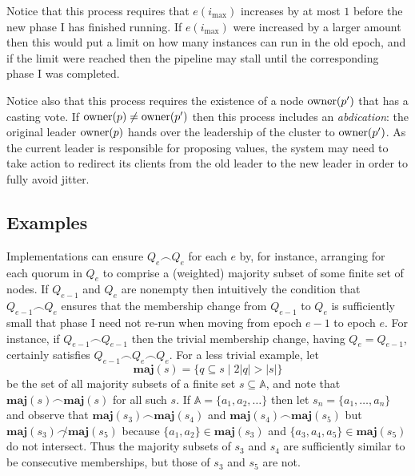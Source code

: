 \documentclass[journal]{IEEEtran}
\begin{document}
Notice that this process requires that $e(i_\mathrm{max})$ increases by at most
$1$ before the new phase I has finished running. If $e(i_\mathrm{max})$ were
increased by a larger amount then this would put a limit on how many instances
can run in the old epoch, and if the limit were reached then the pipeline may
stall until the corresponding phase I was completed.

Notice also that this process requires the existence of a node $\mathrm{owner}(p')$
that has a casting vote. If $\mathrm{owner}(p) \ne \mathrm{owner}(p')$ then this process
includes an \textit{abdication}: the original leader $\mathrm{owner}(p)$ hands over the
leadership of the cluster to $\mathrm{owner}(p')$. As the current leader is responsible
for proposing values, the system may need to take action to redirect its
clients from the old leader to the new leader in order to fully avoid jitter.

\subsection{Examples}\label{types-of-membership-change}

\def\maj#1{\mathbf{maj}(#1)}

Implementations can ensure $Q_e \frown Q_e$ for each $e$ by, for instance,
arranging for each quorum in $Q_e$ to comprise a (weighted) majority subset of
some finite set of nodes.  If $Q_{e-1}$ and $Q_e$ are nonempty then intuitively
the condition that $Q_{e-1} \frown Q_e$ ensures that the membership change from
$Q_{e-1}$ to $Q_e$ is sufficiently small that phase I need not re-run when
moving from epoch $e-1$ to epoch $e$.  For instance, if $Q_{e-1} \frown
Q_{e-1}$ then the trivial membership change, having $Q_e = Q_{e-1}$, certainly
satisfies $Q_{e-1} \frown Q_e \frown Q_e$.
%
For a less trivial example, let \[\maj{s} = \{ q \subseteq s \mid 2 |q| > |s|
\}\] be the set of all majority subsets of a finite set $s \subseteq \mathbb
A$, and note that $\maj{s} \frown \maj{s}$ for all such $s$.  If $\mathbb A =
\{ a_1, a_2, \ldots \}$ then let $s_n = \{a_1, \ldots, a_n\}$ and observe that
${\maj{s_3} \frown \maj{s_4}}$ and ${\maj{s_4} \frown \maj{s_5}}$ but ${\maj{s_3}
\not\frown \maj{s_5}}$ because $\{a_1, a_2\} \in \maj{s_3}$ and $\{a_3, a_4,
a_5\} \in \maj{s_5}$ do not intersect. Thus the majority subsets of $s_3$ and
$s_4$ are sufficiently similar to be consecutive memberships, but those of
$s_3$ and $s_5$ are not.
\end{document}
